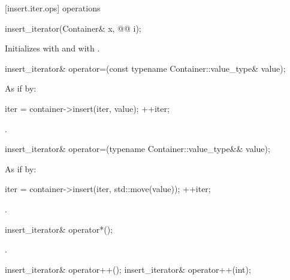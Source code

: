 [insert.iter.ops]{ operations}

%
\begin{itemdecl}
insert_iterator(Container& x, @@ i);
\end{itemdecl}

\begin{itemdescr}
\pnum
\effects
Initializes
with  and
with .
\end{itemdescr}

%
\begin{itemdecl}
insert_iterator& operator=(const typename Container::value_type& value);
\end{itemdecl}

\begin{itemdescr}
\pnum
\effects
As if by:
\begin{codeblock}
iter = container->insert(iter, value);
++iter;
\end{codeblock}

\pnum
\returns
{}.
\end{itemdescr}

%
\begin{itemdecl}
insert_iterator& operator=(typename Container::value_type&& value);
\end{itemdecl}

\begin{itemdescr}
\pnum
\effects
As if by:
\begin{codeblock}
iter = container->insert(iter, std::move(value));
++iter;
\end{codeblock}

\pnum
\returns
{}.
\end{itemdescr}

%
\begin{itemdecl}
insert_iterator& operator*();
\end{itemdecl}

\begin{itemdescr}
\pnum
\returns
{}.
\end{itemdescr}

%
\begin{itemdecl}
insert_iterator& operator++();
insert_iterator& operator++(int);
\end{itemdecl}

